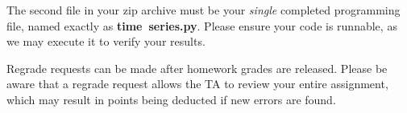 \documentclass[12pt]{article}
\newcommand{\blackcircle}{\tikz\draw[black,fill=black] (0,0) circle (1ex);}
\begin{document}
\begin{itemize}
\begin{itemize}
The second file in your zip archive must be your \emph{single} completed programming file, named exactly as \textbf{time\ series.py}. Please ensure your code is runnable, as we may execute it to verify your results.

Regrade requests can be made after homework grades are released. Please be aware that a regrade request allows the TA to review your entire assignment, which may result in points being deducted if new errors are found.

\end{itemize}

\end{itemize}


\clearpage


\clearpage


\clearpage



\clearpage


\clearpage

\end{document}
